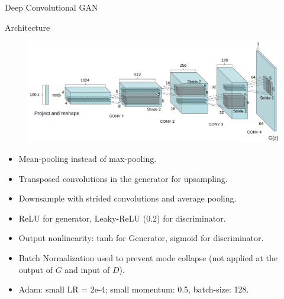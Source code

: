 \begin{frame}{Deep Convolutional GAN}
	\begin{block}{Architecture}
		\vspace{-0.3cm}
		\begin{figure}
			\centering
			\includegraphics[width=0.8\linewidth]{figs/dcgan_1}
		\end{figure}
	\end{block}
	\vspace{-0.4cm}
	\begin{itemize}
		\footnotesize
		\item  Mean-pooling instead of max-pooling.
		\item Transposed convolutions in the generator for upsampling.
		\item Downsample with strided convolutions and average pooling.
		\item ReLU for generator, Leaky-ReLU (0.2) for discriminator.
		\item Output nonlinearity: tanh for Generator, sigmoid for discriminator.
		\item Batch Normalization used to prevent mode collapse (not applied at the output of $G$ and input of $D$).
		\item Adam: small LR = 2e-4; small momentum: 0.5, batch-size: 128.
	\end{itemize}
\end{frame}
